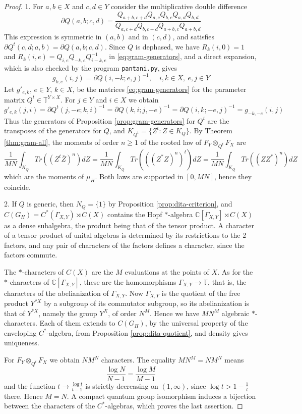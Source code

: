 \documentclass[11pt,reqno]{amsart}
\theoremstyle{definition}
\numberwithin{equation}{section}
\begin{document}
\begin{proof}
1. For $a,b\in X$ and $c,d\in Y$ consider the multiplicative double difference
$$\partial Q(a,b;c,d)=\frac{Q_{a+b,c+d}Q_{a,c}Q_{b,c}Q_{a,d}Q_{b,d}}{Q_{a,c+d}Q_{b,c+d}Q_{a+b,c}Q_{a+b,d}}$$
This expression is symmetric in $(a,b)$ and in $(c,d)$, and satisfies $\partial Q^t(c,d;a,b)=\partial Q(a,b;c,d)$. Since $Q$ is dephased, we have $R_k(i,0)=1$ and $R_k(i,e)=Q_{i,e}Q_{-k,e}Q_{i-k,e}^{-1}$ in \eqref{eq:gram-generators}, and a direct expansion, which is also checked by the program \texttt{pantani.py}, gives
$$g_{k,e}(i,j)=\partial Q(i,-k;e,j)^{-1},
\quad i,k\in X,\ e,j\in Y$$
Let $g'_{e,k}$, $e\in Y$, $k\in X$, be the matrices \eqref{eq:gram-generators} for the parameter matrix $Q^t\in\mathbb T^{Y\times X}$. For $j\in Y$ and $i\in X$ we obtain
$$g'_{e,k}(j,i)
=\partial Q^t(j,-e;k,i)^{-1}
=\partial Q(k,i;j,-e)^{-1}
=\partial Q(i,k;-e,j)^{-1}
=g_{-k,-e}(i,j)$$
Thus the generators of Proposition \ref{prop:gram-generators} for $Q^t$ are the transposes of the generators for $Q$, and $K_{Q^t}=\{Z^t:Z\in K_Q\}$. By Theorem \ref{thm:gram-all}, the moments of order $n\geq1$ of the rooted law of $F_Y\otimes_{Q^t}F_X$ are
$$\frac1{MN}\int_{K_Q}Tr((Z^t\bar Z)^n)dZ
=\frac1{MN}\int_{K_Q}Tr(((Z^*Z)^n)^t)dZ
=\frac1{MN}\int_{K_Q}Tr((ZZ^*)^n)dZ$$
which are the moments of $\mu_H$. Both laws are supported in $[0,MN]$, hence they coincide.

2. If $Q$ is generic, then $N_Q=\{1\}$ by Proposition \ref{prop:dita-criterion}, and $C(G_H)=C^*(\Gamma_{X,Y})\rtimes C(X)$ contains the Hopf $*$-algebra $\mathbb C[\Gamma_{X,Y}]\rtimes C(X)$ as a dense subalgebra, the product being that of the tensor product. A character of a tensor product of unital algebras is determined by its restrictions to the 2 factors, and any pair of characters of the factors defines a character, since the factors commute.

The $*$-characters of $C(X)$ are the $M$ evaluations at the points of $X$. As for the $*$-characters of $\mathbb C[\Gamma_{X,Y}]$, these are the homomorphisms $\Gamma_{X,Y}\to\mathbb T$, that is, the characters of the abelianization of $\Gamma_{X,Y}$. Now $\Gamma_{X,Y}$ is the quotient of the free product $Y^{*X}$ by a subgroup of its commutator subgroup, so its abelianization is that of $Y^{*X}$, namely the group $Y^X$, of order $N^M$. Hence we have $MN^M$ algebraic $*$-characters. Each of them extends to $C(G_H)$, by the universal property of the enveloping $C^*$-algebra, from Proposition \ref{prop:dita-quotient}, and density gives uniqueness.

For $F_Y\otimes_{Q^t}F_X$ we obtain $NM^N$ characters. The equality $MN^M=NM^N$ means
$$\frac{\log N}{N-1}=\frac{\log M}{M-1}$$
and the function $t\to\frac{\log t}{t-1}$ is strictly decreasing on $(1,\infty)$, since $\log t>1-\frac1t$ there. Hence $M=N$. A compact quantum group isomorphism induces a bijection between the characters of the $C^*$-algebras, which proves the last assertion.
\end{proof}
\end{document}
